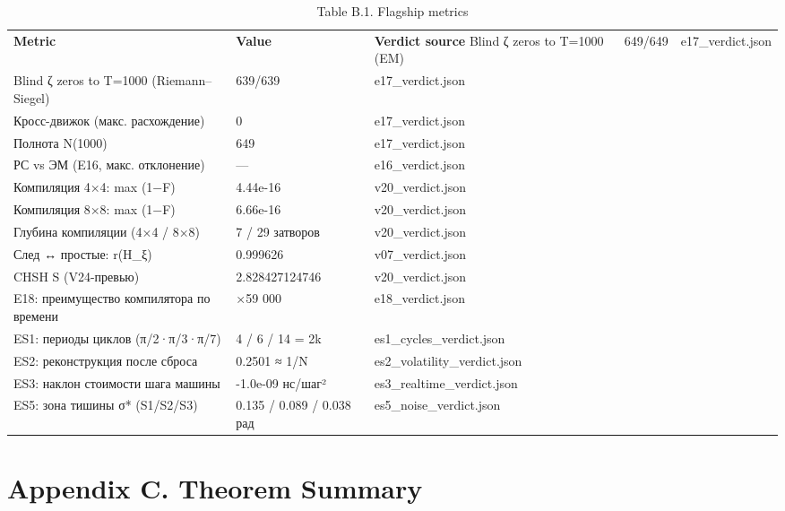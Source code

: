 \documentclass[11pt,a4paper]{article}
\begin{document}
\begin{table}[htbp]\centering\small
\caption{Table B.1. Flagship metrics}
\begin{tabular}{p{} p{} p{}}
\toprule
\textbf{Metric} & \textbf{Value} & \textbf{Verdict source}
\midrule
Blind ζ zeros to T=1000 (EM) & 649/649 & e17\_verdict.json \\
Blind ζ zeros to T=1000 (Riemann–Siegel) & 639/639 & e17\_verdict.json \\
Кросс-движок (макс. расхождение) & 0 & e17\_verdict.json \\
Полнота N(1000) & 649 & e17\_verdict.json \\
РС vs ЭМ (E16, макс. отклонение) & — & e16\_verdict.json \\
Компиляция 4×4: max (1−F) & 4.44e-16 & v20\_verdict.json \\
Компиляция 8×8: max (1−F) & 6.66e-16 & v20\_verdict.json \\
Глубина компиляции (4×4 / 8×8) & 7 / 29 затворов & v20\_verdict.json \\
След ↔ простые: r(H\_ξ) & 0.999626 & v07\_verdict.json \\
CHSH S (V24-превью) & 2.828427124746 & v20\_verdict.json \\
E18: преимущество компилятора по времени & ×59 000 & e18\_verdict.json \\
ES1: периоды циклов (π/2·π/3·π/7) & 4 / 6 / 14 = 2k & es1\_cycles\_verdict.json \\
ES2: реконструкция после сброса & 0.2501 ≈ 1/N & es2\_volatility\_verdict.json \\
ES3: наклон стоимости шага машины & -1.0e-09 нс/шаг² & es3\_realtime\_verdict.json \\
ES5: зона тишины σ* (S1/S2/S3) & 0.135 / 0.089 / 0.038 рад & es5\_noise\_verdict.json \\
\bottomrule
\end{tabular}
\end{table}

\section{Appendix C. Theorem Summary}
\end{document}
